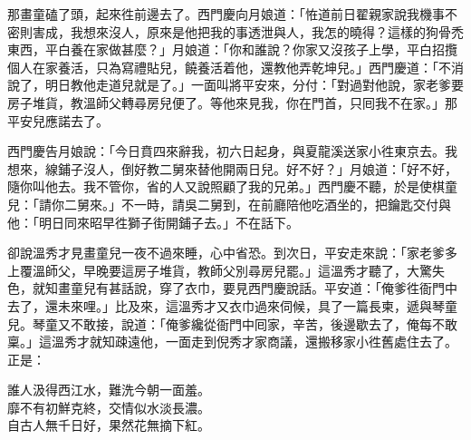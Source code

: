 那畫童磕了頭，起來徃前邊去了。西門慶向月娘道：「恠道前日翟親家說我機事不密則害成，我想來沒人，原來是他把我的事透泄與人，我怎的曉得？這樣的狗骨禿東西，平白養在家做甚麼？」月娘道：「你和誰說？你家又沒孩子上學，平白招攬個人在家養活，只為寫禮貼兒，饒養活着他，還教他弄乾坤兒。」西門慶道：「不消說了，明日教他走道兒就是了。」一面叫將平安來，分付：「對過對他說，家老爹要房子堆貨，教溫師父轉尋房兒便了。等他來見我，你在門首，只囘我不在家。」那平安兒應諾去了。

西門慶告月娘說：「今日賁四來辭我，初六日起身，與夏龍溪送家小徃東京去。我想來，線鋪子沒人，倒好教二舅來替他開兩日兒。好不好？」月娘道：「好不好，隨你叫他去。我不管你，省的人又說照顧了我的兄弟。」西門慶不聽，於是使棋童兒：「請你二舅來。」不一時，請吳二舅到，在前廳陪他吃酒坐的，把鑰匙交付與他：「明日同來昭早徃獅子街開鋪子去。」不在話下。

卻說溫秀才見畫童兒一夜不過來睡，心中省恐。到次日，平安走來說：「家老爹多上覆溫師父，早晚要這房子堆貨，教師父別尋房兒罷。」這溫秀才聽了，大驚失色，就知畫童兒有甚話說，穿了衣巾，要見西門慶說話。平安道：「俺爹徃衙門中去了，還未來哩。」比及來，這溫秀才又衣巾過來伺候，具了一篇長柬，{}遞與琴童兒。琴童又不敢接，說道：「俺爹纔從衙門中囘家，辛苦，後邊歇去了，俺每不敢稟。」這溫秀才就知疎遠他，一面走到倪秀才家商議，還搬移家小徃舊處住去了。正是：

\begin{myquote} 
誰人汲得西江水，難洗今朝一面羞。\\靡不有初鮮克終，交情似水淡長濃。\\自古人無千日好，果然花無摘下紅。
\end{myquote} 

